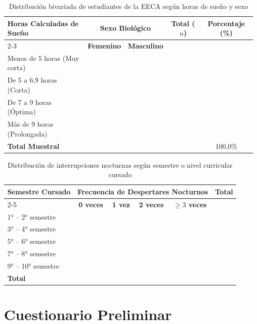 \documentclass[12pt, letterpaper]{article}
\begin{document}
\begin{table}[H]
\centering
\caption{Distribución bivariada de estudiantes de la EECA según horas de sueño y sexo}
\label{tab:tabulacion4}
\vspace{0.25cm}
\small
\begin{tabular}{lcccc}
\toprule
\textbf{Horas Calculadas de Sueño} & \multicolumn{2}{c}{\textbf{Sexo Biológico}} & \textbf{Total ($n$)} & \textbf{Porcentaje (\%)} \\
\cmidrule(lr){2-3}
& \textbf{Femenino} & \textbf{Masculino} & & \\
\midrule
Menos de 5 horas (Muy corta) & & & & \\
De 5 a 6,9 horas (Corta) & & & & \\
De 7 a 9 horas (Óptima) & & & & \\
Más de 9 horas (Prolongada) & & & & \\
\midrule
\textbf{Total Muestral} & & & & 100,0\% \\
\bottomrule
\end{tabular}
\end{table}

\vspace{0.3cm}

\begin{table}[H]
\centering
\caption{Distribución de interrupciones nocturnas según semestre o nivel curricular cursado}
\label{tab:tabulacion5}
\vspace{0.25cm}
\small
\begin{tabular}{lccccc}
\toprule
\textbf{Semestre Cursado} & \multicolumn{4}{c}{\textbf{Frecuencia de Despertares Nocturnos}} & \textbf{Total} \\
\cmidrule(lr){2-5}
& \textbf{0 veces} & \textbf{1 vez} & \textbf{2 veces} & \textbf{$\ge 3$ veces} & \\
\midrule
1° -- 2° semestre & & & & & \\
3° -- 4° semestre & & & & & \\
5° -- 6° semestre & & & & & \\
7° -- 8° semestre & & & & & \\
9° -- 10° semestre & & & & & \\
\midrule
\textbf{Total} & & & & & \\
\bottomrule
\end{tabular}
\end{table}


\section{Cuestionario Preliminar}
\end{document}
